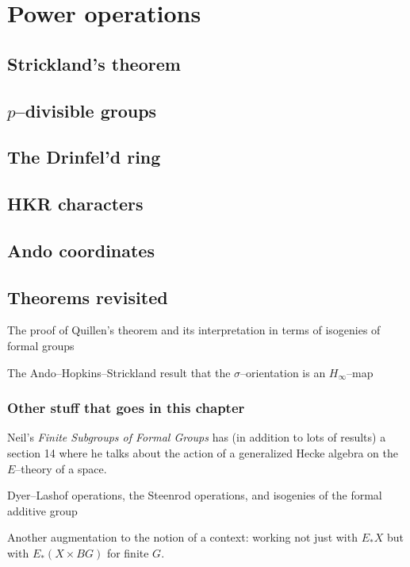 
\chapter{Power operations}

\section{Strickland's theorem}

\section{$p$--divisible groups}

\section{The Drinfel'd ring}

\section{HKR characters}

\section{Ando coordinates}

\section{Theorems revisited}

The proof of Quillen's theorem and its interpretation in terms of isogenies of formal groups

The Ando--Hopkins--Strickland result that the $\sigma$--orientation is an $H_\infty$--map

\subsection*{Other stuff that goes in this chapter}

Neil's \textit{Finite Subgroups of Formal Groups} has (in addition to lots of results) a section 14 where he talks about the action of a generalized Hecke algebra on the $E$--theory of a space.

Dyer--Lashof operations, the Steenrod operations, and isogenies of the formal additive group 

Another augmentation to the notion of a context: working not just with $E_* X$ but with $E_*(X \times BG)$ for finite $G$.
